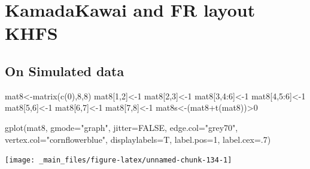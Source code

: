 \documentclass[
  notitlepage,
  onecolumn,
  openany]{book}
\newenvironment{Shaded}{\begin{snugshade}}{\end{snugshade}}
\newcommand{\AttributeTok}[1]{\textcolor[rgb]{0.77,0.63,0.00}{#1}}
\newcommand{\ConstantTok}[1]{\textcolor[rgb]{0.00,0.00,0.00}{#1}}
\newcommand{\DecValTok}[1]{\textcolor[rgb]{0.00,0.00,0.81}{#1}}
\newcommand{\FunctionTok}[1]{\textcolor[rgb]{0.00,0.00,0.00}{#1}}
\newcommand{\NormalTok}[1]{#1}
\newcommand{\OtherTok}[1]{\textcolor[rgb]{0.56,0.35,0.01}{#1}}
\newcommand{\SpecialCharTok}[1]{\textcolor[rgb]{0.00,0.00,0.00}{#1}}
\newcommand{\StringTok}[1]{\textcolor[rgb]{0.31,0.60,0.02}{#1}}
\begin{document}
\hypertarget{kamadakawai-and-fr-layout-khfs}{%
\section{KamadaKawai and FR layout KHFS}\label{kamadakawai-and-fr-layout-khfs}}

\hypertarget{on-simulated-data}{%
\subsection{On Simulated data}\label{on-simulated-data}}

\begin{Shaded}
\begin{Highlighting}[]
\NormalTok{mat8}\OtherTok{\textless{}{-}}\FunctionTok{matrix}\NormalTok{(}\FunctionTok{c}\NormalTok{(}\DecValTok{0}\NormalTok{),}\DecValTok{8}\NormalTok{,}\DecValTok{8}\NormalTok{)}
\NormalTok{mat8[}\DecValTok{1}\NormalTok{,}\DecValTok{2}\NormalTok{]}\OtherTok{\textless{}{-}}\DecValTok{1}
\NormalTok{mat8[}\DecValTok{2}\NormalTok{,}\DecValTok{3}\NormalTok{]}\OtherTok{\textless{}{-}}\DecValTok{1}
\NormalTok{mat8[}\DecValTok{3}\NormalTok{,}\DecValTok{4}\SpecialCharTok{:}\DecValTok{6}\NormalTok{]}\OtherTok{\textless{}{-}}\DecValTok{1}
\NormalTok{mat8[}\DecValTok{4}\NormalTok{,}\DecValTok{5}\SpecialCharTok{:}\DecValTok{6}\NormalTok{]}\OtherTok{\textless{}{-}}\DecValTok{1}
\NormalTok{mat8[}\DecValTok{5}\NormalTok{,}\DecValTok{6}\NormalTok{]}\OtherTok{\textless{}{-}}\DecValTok{1}
\NormalTok{mat8[}\DecValTok{6}\NormalTok{,}\DecValTok{7}\NormalTok{]}\OtherTok{\textless{}{-}}\DecValTok{1}
\NormalTok{mat8[}\DecValTok{7}\NormalTok{,}\DecValTok{8}\NormalTok{]}\OtherTok{\textless{}{-}}\DecValTok{1}
\NormalTok{mat8s}\OtherTok{\textless{}{-}}\NormalTok{(mat8}\SpecialCharTok{+}\FunctionTok{t}\NormalTok{(mat8))}\SpecialCharTok{\textgreater{}}\DecValTok{0}

\FunctionTok{gplot}\NormalTok{(mat8, }
      \AttributeTok{gmode=}\StringTok{"graph"}\NormalTok{,}
      \AttributeTok{jitter=}\ConstantTok{FALSE}\NormalTok{,}
      \AttributeTok{edge.col=}\StringTok{"grey70"}\NormalTok{,}
      \AttributeTok{vertex.col=}\StringTok{"cornflowerblue"}\NormalTok{,}
      \AttributeTok{displaylabels=}\NormalTok{T,}
      \AttributeTok{label.pos=}\DecValTok{1}\NormalTok{,}
      \AttributeTok{label.cex=}\NormalTok{.}\DecValTok{7}\NormalTok{)}
\end{Highlighting}
\end{Shaded}

\begin{center}\texttt{[image: \_main\_files/figure-latex/unnamed-chunk-134-1]} \end{center}
\end{document}
